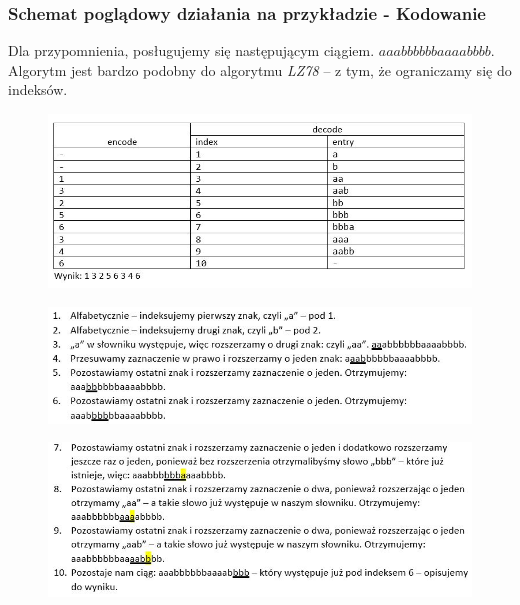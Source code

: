 \documentclass{article}
\begin{document}
\subsubsection{Schemat poglądowy działania na przykładzie - Kodowanie}
Dla przypomnienia, posługujemy się następującym ciągiem. $aaabbbbbbaaaabbbb$.\\
Algorytm jest bardzo podobny do algorytmu \textit{LZ78} – z tym, że ograniczamy się do indeksów.

\begin{figure}[h!]
\centering
\includegraphics{img/lzw_1.JPG}
\end{figure}

\begin{figure}[h!]
\centering
\includegraphics{img/lzw_2.JPG}
\end{figure}

\newpage

\begin{figure}[h!]
\centering
\includegraphics{img/lzw_2_1.JPG}
\end{figure}
\end{document}
